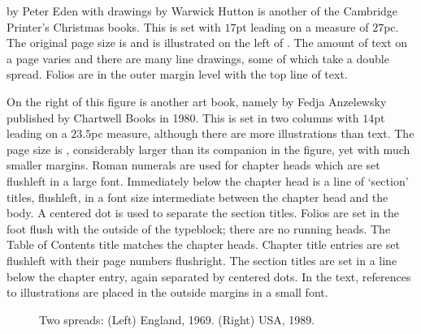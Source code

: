 \documentclass[10pt,letterpaper,extrafontsizes]{memoir}
\begin{document}
     by Peter Eden with drawings by
Warwick Hutton is another of the Cambridge 
Printer's Christmas books.
This is set with $17$pt leading on a measure of $27$pc. The original
page size is  and is illustrated on the left 
of . 
The amount of text on a page varies
and there are many line drawings, some of which take a double spread.
Folios are in the outer margin level with the top
line of text.

On the right of this figure is another art book, namely 
by Fedja Anzelewsky published by Chartwell Books in 1980. This is set in
two columns with $14$pt leading on a $23.5$pc measure, 
although there are more illustrations than text. The page
size is , considerably larger than its companion in
the figure, yet with much smaller margins.
Roman numerals are used for chapter heads which are
set flushleft in a large font. Immediately below the chapter head is a line
of `section' titles, flushleft, in a font size intermediate between the
chapter head and the body. A centered dot is used to separate the section
titles. Folios are set in the foot flush
with the outside of the typeblock; there are no running heads. 
The Table of Contents title matches the chapter heads.
Chapter title entries are set flushleft with their page numbers flushright.
The section titles are set in a line below the chapter entry, again separated
by centered dots. In the text, references to 
illustrations are placed in the outside margins in 
a small font.

\begin{figure}
\centering
\begin{minipage}[b]{\pwlayi}
\end{minipage}
\hfill
\begin{minipage}[b]{\pwlayi}
\end{minipage}
\caption[Two spreads: England, 1969 and USA 1989]%
        {Two spreads: (Left) England, 1969.
         (Right) USA, 1989.} \label{fb:16}
\end{figure}
\end{document}
